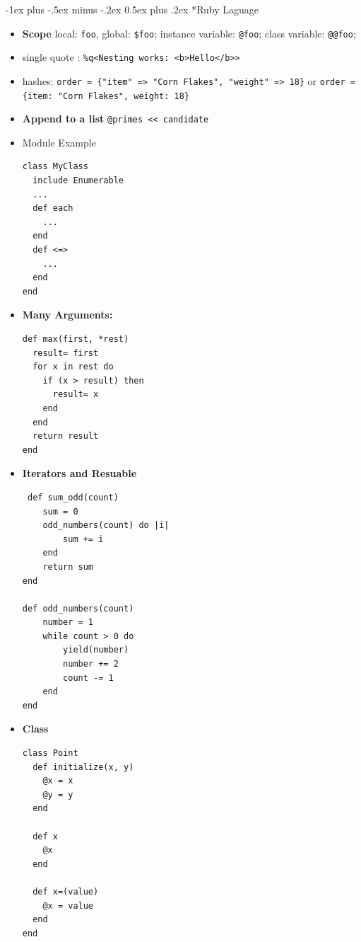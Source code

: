 \documentclass[10pt,landscape]{article}
\makeatletter
\renewcommand{\section}{\@startsection{section}{1}{0mm}%
                                {-1ex plus -.5ex minus -.2ex}%
                                {0.5ex plus .2ex}%
                                {\normalfont\large\bfseries}}
\makeatother
\begin{document}
\begin{multicols}{2}
\begin{itemize}
\end{itemize}
\section*{Ruby Laguage}
\begin{itemize}
\item \textbf{Scope} local: \verb|foo|, global: \verb|$foo|; instance variable: \verb|@foo|; class variable: \verb|@@foo|;
\item single quote : \verb|%q<Nesting works: <b>Hello</b>>|
\item hashes: \verb|order = {"item" => "Corn Flakes", "weight" => 18}| or  \verb|order = {item: "Corn Flakes", weight: 18}|
\item \textbf{Append to a list} \verb|@primes << candidate|
\item Module Example 
\begin{verbatim}
class MyClass
  include Enumerable
  ...
  def each
    ...
  end
  def <=>
    ...
  end
end
\end{verbatim}
\item\textbf{ Many Arguments:}
\begin{verbatim}
def max(first, *rest)
  result= first
  for x in rest do
    if (x > result) then
      result= x
    end
  end
  return result
end
\end{verbatim}

\item \textbf{Iterators and Resuable}
\begin{verbatim}
 def sum_odd(count)
    sum = 0
    odd_numbers(count) do |i|
        sum += i
    end
    return sum
end

def odd_numbers(count)
    number = 1
    while count > 0 do
        yield(number)
        number += 2
        count -= 1
    end
end
\end{verbatim}
\item \textbf{Class}
\begin{verbatim}
class Point
  def initialize(x, y)
    @x = x
    @y = y
  end
  
  def x
    @x
  end
  
  def x=(value)
    @x = value
  end
end

\end{verbatim}
\end{itemize}

\end{multicols}
\end{document}
